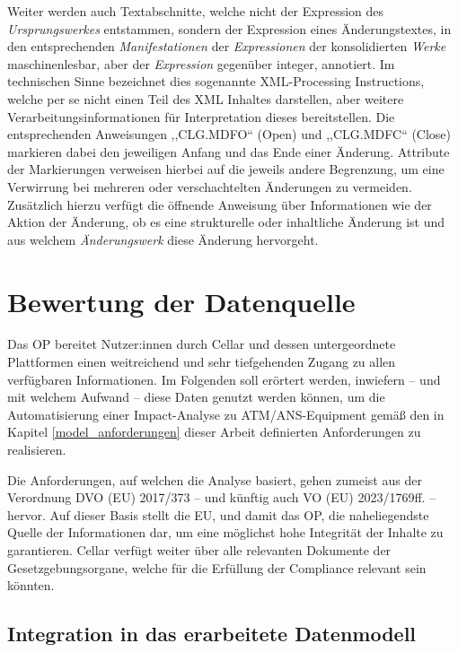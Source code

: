     \medskip
    Weiter werden auch Textabschnitte, welche nicht der Expression des \textit{Ursprungswerkes} entstammen, sondern der Expression eines Änderungstextes, in den entsprechenden \textit{Manifestationen} der \textit{Expressionen} der konsolidierten \textit{Werke} maschinenlesbar, aber der \textit{Expression} gegenüber integer, annotiert. 
    Im technischen Sinne bezeichnet dies sogenannte \ac{XML}-Processing Instructions, welche per se nicht einen Teil des \ac{XML} Inhaltes darstellen, aber weitere Verarbeitungsinformationen für Interpretation dieses bereitstellen. 
    Die entsprechenden Anweisungen ,,\textsf{CLG.MDFO}`` (Open) und ,,\textsf{CLG.MDFC}`` (Close) markieren dabei den jeweiligen Anfang und das Ende einer Änderung. 
    Attribute der Markierungen verweisen hierbei auf die jeweils andere Begrenzung, um eine Verwirrung bei mehreren oder verschachtelten Änderungen zu vermeiden.
    Zusätzlich hierzu verfügt die öffnende Anweisung über Informationen wie der Aktion der Änderung, ob es eine strukturelle oder inhaltliche Änderung ist und aus welchem \textit{Änderungswerk} diese Änderung hervorgeht. 
    \cite[vgl. S. 76 -- 79]{eu_fmx4_proc}
    
\section{Bewertung der Datenquelle}

    Das \acf{OP} bereitet Nutzer:innen durch Cellar und dessen untergeordnete Plattformen einen weitreichend und sehr tiefgehenden Zugang zu allen verfügbaren Informationen.
    Im Folgenden soll erörtert werden, inwiefern -- und mit welchem Aufwand -- diese Daten genutzt werden können, um die Automatisierung einer Impact-Analyse zu ATM/ANS-Equipment gemäß den in Kapitel \ref{model_anforderungen} dieser Arbeit definierten Anforderungen zu realisieren.
    
    Die Anforderungen, auf welchen die Analyse basiert, gehen zumeist aus der Verordnung \ac{DVO} (\ac{EU}) 2017/373 -- und künftig auch \ac{VO} (\ac{EU}) 2023/1769ff. -- hervor. 
    Auf dieser Basis stellt die \ac{EU}, und damit das \ac{OP}, die naheliegendste Quelle der Informationen dar, um eine möglichst hohe Integrität der Inhalte zu garantieren.
    Cellar verfügt weiter über alle relevanten Dokumente der Gesetzgebungsorgane, welche für die Erfüllung der Compliance relevant sein könnten. 

\pagebreak
\subsection{Integration in das erarbeitete Datenmodell}
    

